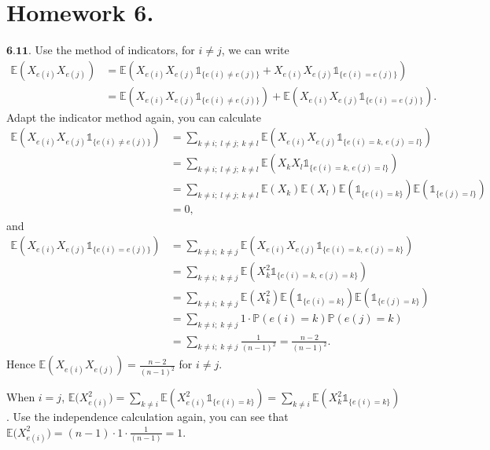 \documentclass[12pt]{article}
\begin{document}
\section*{Homework 6.}
$\textbf{6.11.}$ Use the method of indicators, for $i\neq j$, we can write 
\begin{equation*}
\begin{aligned}
\mathbb{E}(X_{e(i)}X_{e(j)}) &= \mathbb{E}(X_{e(i)}X_{e(j)}\mathds{1}_{\{e(i)\neq e(j)\}}+X_{e(i)}X_{e(j)}\mathds{1}_{\{e(i)= e(j)\}}) \\&
=\mathbb{E}(X_{e(i)}X_{e(j)}\mathds{1}_{\{e(i)\neq e(j)\}})+\mathbb{E}(X_{e(i)}X_{e(j)}\mathds{1}_{\{e(i)= e(j)\}}).
\end{aligned}
\end{equation*}
Adapt the indicator method again, you can calculate
\begin{equation*}
\begin{aligned}
\mathbb{E}(X_{e(i)}X_{e(j)}\mathds{1}_{\{e(i)\neq e(j)\}}) &= \sum_{k\neq i;\;l\neq j;\; k\neq l}\mathbb{E}(X_{e(i)}X_{e(j)}\mathds{1}_{\{e(i)=k,\,e(j)=l\}}) \\&
=\sum_{k\neq i;\;l\neq j;\; k\neq l}\mathbb{E}(X_k X_l\mathds{1}_{\{e(i)=k,\,e(j)=l\}}) \\&
=\sum_{k\neq i;\;l\neq j;\; k\neq l}\mathbb{E}(X_k)\mathbb{E}(X_l)\mathbb{E}(\mathds{1}_{\{e(i)=k\}})\mathbb{E}(\mathds{1}_{\{e(j)=l\}}) \\&
=0,
\end{aligned}
\end{equation*}
and
\begin{equation*}
\begin{aligned}
\mathbb{E}(X_{e(i)}X_{e(j)}\mathds{1}_{\{e(i)=e(j)\}}) &= \sum_{k\neq i;\;k\neq j}\mathbb{E}(X_{e(i)}X_{e(j)}\mathds{1}_{\{e(i)=k,\,e(j)=k\}}) \\&
=\sum_{k\neq i;\;k\neq j}\mathbb{E}(X_k^2\mathds{1}_{\{e(i)=k,\,e(j)=k\}}) \\&
=\sum_{k\neq i;\;k\neq j}\mathbb{E}(X_k^2)\mathbb{E}(\mathds{1}_{\{e(i)=k\}})\mathbb{E}(\mathds{1}_{\{e(j)=k\}}) \\&
=\sum_{k\neq i;\;k\neq j}1\cdot\mathbb{P}(e(i)=k)\mathbb{P}(e(j)=k) \\&
=\sum_{k\neq i;\;k\neq j}\frac{1}{(n-1)^2} = \frac{n-2}{(n-1)^2}.
\end{aligned}
\end{equation*}
Hence $\mathbb{E}(X_{e(i)}X_{e(j)})=\frac{n-2}{(n-1)^2}$ for $i\neq j$.

When $i=j$, $\mathbb{E}\big(X_{e(i)}^2\big)=\sum_{k\neq i}\mathbb{E}(X_{e(i)}^2\mathds{1}_{\{e(i)=k\}})=\sum_{k\neq i}\mathbb{E}(X_k^2\mathds{1}_{\{e(i)=k\}})$. Use the independence calculation again, you can see that $\mathbb{E}\big(X_{e(i)}^2\big)=(n-1)\cdot1\cdot\frac{1}{(n-1)}=1$.
\end{document}

